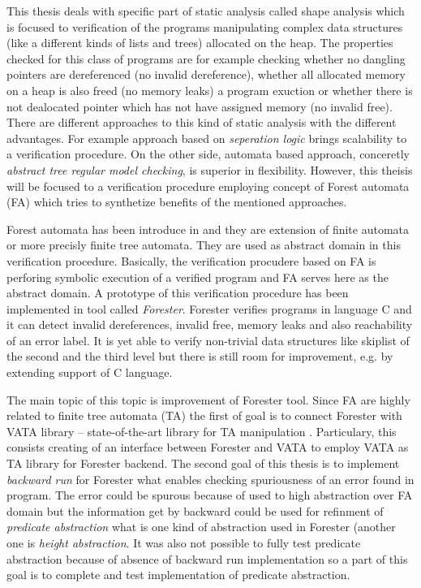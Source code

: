 This thesis deals with specific part of static analysis called shape analysis which is focused to verification of the programs manipulating
complex data structures (like a different kinds of lists and trees) allocated on the heap.
The properties checked for this class of programs are for example checking whether no dangling
pointers are dereferenced (no invalid dereference), whether all allocated memory on a heap is also freed (no memory leaks)
a program exuction or whether there is not dealocated pointer which has not have assigned memory (no invalid free).
There are different approaches to this kind of static analysis with the different advantages.
For example approach based on \emph{seperation logic} brings scalability to a verification procedure.
On the other side, automata based approach, conceretly \emph{abstract tree regular model checking}, is
superior in flexibility.
However, this theisis will be focused to a verification procedure employing concept of Forest automata (FA) which tries
to synthetize benefits of the mentioned approaches.

Forest automata has been introduce in \cite{forester} and they are extension of finite automata or more precisly finite tree automata.
They are used as abstract domain in this verification procedure.
Basically, the verification procudere based on FA is perforing symbolic execution of a verified program and
FA serves here as the abstract domain.
A prototype of this verification procedure has been implemented in tool called \emph{Forester}.
Forester verifies programs in language C and it can detect invalid dereferences, invalid free, memory leaks and also reachability of an error label.
It is yet able to verify non-trivial data structures like skiplist of the second and the third level
but there is still room for improvement, e.g. by extending support of C language.

The main topic of this topic is improvement of Forester tool.
Since FA are highly related to finite tree automata (TA) the first of goal is to connect
Forester with VATA library -- state-of-the-art library for TA manipulation \cite{tacas12}.
Particulary, this consists creating of an interface between Forester and VATA to employ VATA as TA library for Forester backend.
The second goal of this thesis is to implement \emph{backward run} for Forester what enables checking spuriousness of an error found in program.
The error could be spurous because of used to high abstraction over FA domain but the information get by backward could be used for refinment of \emph{predicate abstraction}
what is one kind of abstraction used in Forester (another one is \emph{height abstraction}.
It was also not possible to fully test predicate abstraction because of absence of backward run implementation
so a part of this goal is to complete and test implementation of predicate abstraction.

